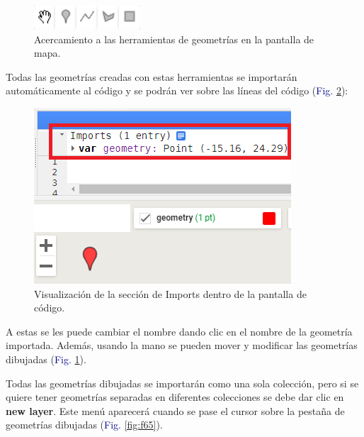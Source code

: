 \documentclass[
  12pt,
  letterpaper,
  twoside]{book}
\begin{document}
\begin{figure}[H]

{\centering \includegraphics[width=0.7\linewidth]{Img/herrams} 

}

\caption{Acercamiento a las herramientas de geometrías en la pantalla de mapa.}\label{fig:f63}
\end{figure}

Todas las geometrías creadas con estas herramientas se importarán automáticamente al código y se podrán ver sobre las líneas del código (\textcolor{darkblue}{Fig.} \ref{fig:f64}):

\begin{figure}[H]

{\centering \includegraphics[width=0.7\linewidth]{Img/import} 

}

\caption{Visualización de la sección de Imports dentro de la pantalla de código.}\label{fig:f64}
\end{figure}

A estas se les puede cambiar el nombre dando clic en el nombre de la geometría importada. Además, usando la mano se pueden mover y modificar las geometrías dibujadas (\textcolor{darkblue}{Fig.} \ref{fig:f63}).

Todas las geometrías dibujadas se importarán como una sola colección, pero si se quiere tener geometrías separadas en diferentes colecciones se debe dar clic en \textbf{new layer}. Este menú aparecerá cuando se pase el cursor sobre la pestaña de geometrías dibujadas (\textcolor{darkblue}{Fig.} \ref{fig:f65}).
\end{document}
